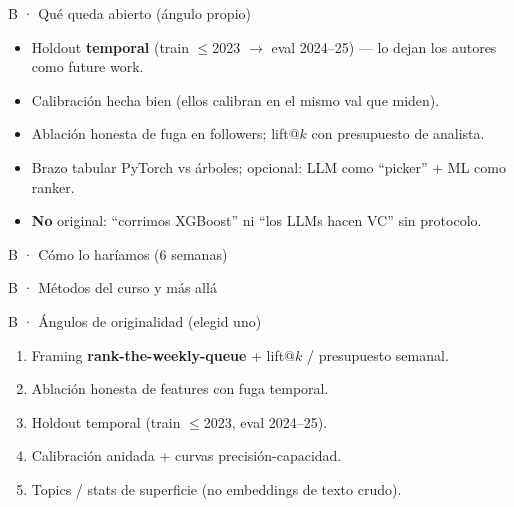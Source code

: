 \documentclass[aspectratio=169,10pt]{beamer}
\begin{document}
\begin{frame}{B · Qué queda abierto (ángulo propio)}
  \begin{itemize}
    \item Holdout \textbf{temporal} (train $\leq$2023 $\to$ eval 2024--25) --- lo dejan los autores como future work.
    \item Calibración hecha bien (ellos calibran en el mismo val que miden).
    \item Ablación honesta de fuga en followers; lift@$k$ con presupuesto de analista.
    \item Brazo tabular PyTorch vs árboles; opcional: LLM como ``picker'' + ML como ranker.
    \item \textbf{No} original: ``corrimos XGBoost'' ni ``los LLMs hacen VC'' sin protocolo.
  \end{itemize}
\end{frame}

\begin{frame}{B · Cómo lo haríamos (6 semanas)}
\end{frame}

\begin{frame}{B · Métodos del curso y más allá}
\end{frame}

\begin{frame}{B · Ángulos de originalidad (elegid uno)}
  \begin{enumerate}
    \item Framing \textbf{rank-the-weekly-queue} + lift@$k$ / presupuesto semanal.
    \item Ablación honesta de features con fuga temporal.
    \item Holdout temporal (train $\leq$2023, eval 2024--25).
    \item Calibración anidada + curvas precisión-capacidad.
    \item Topics / stats de superficie (no embeddings de texto crudo).
  \end{enumerate}
\end{frame}
\end{document}
